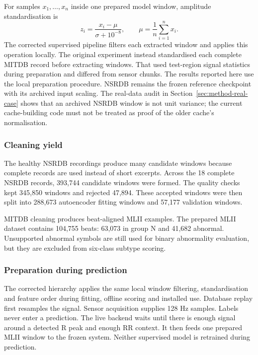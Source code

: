 For samples $x_1,\ldots,x_n$ inside one prepared model window, amplitude
standardisation is
\begin{equation}
 z_i=\frac{x_i-\mu}{\sigma+10^{-8}},\qquad
 \mu=\frac{1}{n}\sum_{i=1}^{n}x_i.
\end{equation}
The corrected supervised pipeline filters each extracted window and applies
this operation locally. The original experiment instead standardised each
complete MITDB record before extracting windows. That used test-region signal
statistics during preparation and differed from sensor chunks. The results reported here use the local
preparation procedure. NSRDB remains the frozen
reference checkpoint with its archived input scaling. The real-data audit in
Section~\ref{sec:method-real-case} shows that an archived NSRDB window is not
unit variance; the current cache-building code must not be treated as proof
of the older cache's normalisation.

\subsubsection{Cleaning yield}

The healthy NSRDB recordings produce many candidate windows because complete
records are used instead of short excerpts. Across the 18 complete NSRDB
records, 393,744 candidate windows were formed. The quality checks kept 345,850
windows and rejected 47,894. These accepted windows were then split into
288,673 autoencoder fitting windows and 57,177 validation windows.

MITDB cleaning produces beat-aligned MLII examples. The prepared MLII dataset
contains 104,755 beats: 63,073 in group N and 41,682 abnormal. Unsupported abnormal
symbols are still used for binary abnormality evaluation, but they are excluded
from six-class subtype scoring.

\subsubsection{Preparation during prediction}

The corrected hierarchy applies the same local window filtering,
standardisation and feature order during fitting, offline scoring and
installed use. Database replay first resamples the signal. Sensor acquisition
supplies 128 Hz samples. Labels never enter a prediction.
The live backend waits until there is enough signal around a detected R peak
and enough RR context. It then feeds one prepared MLII window to the frozen
system. Neither supervised model is retrained during prediction.

